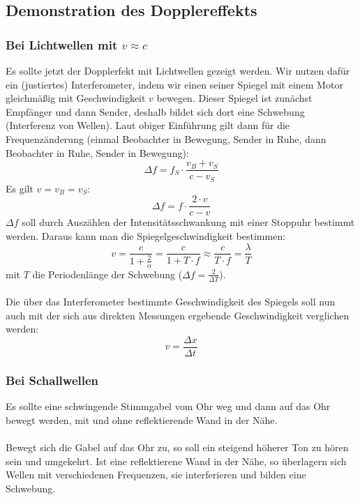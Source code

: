 \documentclass[a4paper,titlepage]{scrartcl}
\numberwithin{equation}{section}
\begin{document}
\subsection{Demonstration des Dopplereffekts}
\subsubsection{Bei Lichtwellen mit $v \approx c$}
Es sollte jetzt der Dopplerfekt mit Lichtwellen gezeigt werden. Wir nutzen dafür ein (justiertes) Interferometer, indem wir einen seiner Spiegel mit einem Motor gleichmäßig mit Geschwindigkeit $v$ bewegen. Dieser Spiegel ist zunächst Empfänger und dann Sender, deshalb bildet sich dort eine Schwebung (Interferenz von Wellen). Laut obiger Einführung gilt dann für die Frequenzänderung (einmal Beobachter in Bewegung, Sender in Ruhe, dann Beobachter in Ruhe, Sender in Bewegung):
\begin{equation*}
\Delta f=f_S \cdot \frac{v_B + v_S}{c-v_S}
\end{equation*} 
Es gilt $v=v_B=v_S$:
\begin{equation*}
\Delta f = f \cdot \frac{2 \cdot v}{c - v}
\end{equation*}
$\Delta f$ soll durch Auszählen der Intensitätsschwankung mit einer Stoppuhr bestimmt werden. Daraus kann man die Spiegelgeschwindigkeit bestimmen:
\begin{equation*}
v=\frac{c}{1 + \frac{2}{\alpha}} = \frac{c}{1 + T \cdot f} \approx \frac{c}{T \cdot f} = \frac{\lambda}{T}
\end{equation*}
mit $T$ die Periodenlänge der Schwebung ($\Delta f = \frac{2}{\Delta T}$).\\ \\
Die über das Interferometer bestimmte Geschwindigkeit des Spiegels soll nun auch mit der sich aus direkten Messungen ergebende Geschwindigkeit verglichen werden:
\begin{equation*}
v=\frac{\Delta x}{\Delta t}
\end{equation*}
\subsubsection{Bei Schallwellen}
Es sollte eine schwingende Stimmgabel vom Ohr weg und dann auf das Ohr bewegt werden, mit und ohne reflektierende Wand in der Nähe.\\ \\
Bewegt sich die Gabel auf das Ohr zu, so soll ein steigend höherer Ton zu hören sein und umgekehrt. Ist eine reflektierene Wand in der Nähe, so überlagern sich Wellen mit verschiedenen Frequenzen, sie interferieren und bilden eine Schwebung.
\newpage
\end{document}
